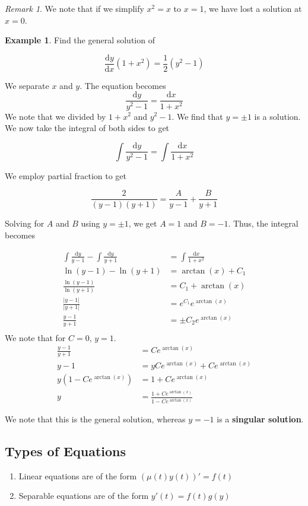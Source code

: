 \documentclass[11pt]{article}
\theoremstyle{plain} %
\theoremstyle{definition}
\theoremstyle{example}
\newtheorem*{example}{Example}
\theoremstyle{remark}
\newtheorem*{remark}{Remark}
\begin{document}
\begin{remark}
We note that if we simplify $x^2=x$ to $x=1$, we have lost a solution at $x=0$. 
\end{remark}

\begin{example}
Find the general solution of 

$$\frac{\mathrm d y}{\mathrm d x}\left(1+x^2\right) = \frac{1}{2}\left(y^2-1\right)$$
\end{example}

We separate $x$ and $y$. The equation becomes$$\frac{\mathrm d y}{y^2-1} = \frac{\mathrm d x}{1+x^2}$$ We note that we divided by $1+x^2$ and $y^2-1$. We find that $y=\pm 1$ is a solution. We now take the integral of both sides to get

$$ \int \frac{\mathrm d y}{y^2-1} =\int  \frac{\mathrm d x}{1+x^2}$$

We employ partial fraction to get 

$$\frac{2}{(y-1)(y+1)} = \frac{A}{y-1} + \frac{B}{y+1}$$

Solving for $A$ and $B$ using $y = \pm 1$, we get $A = 1$ and $B = -1$. Thus, the integral becomes

\begin{align*}
	\int \frac{\mathrm d y}{y-1} - \int \frac{\mathrm d y}{y+1} &= \int \frac{\mathrm d x}{1+x^2} \\
	\ln(y-1) - \ln(y+1) &= \arctan(x)+C_1\\
	\frac{\ln(y-1)}{\ln(y+1)} &= C_1 + \arctan(x)\\
	\frac{|y-1|}{|y+1|} &= e^{C_1}e^{\arctan(x)}\\
	\frac{y-1}{y+1} &= \pm C_2e^{\arctan(x)}\\
\end{align*}
We note that for $C=0$, $y=1$.
\begin{align*}
	\frac{y-1}{y+1} &= Ce^{\arctan(x)}\\
	y-1 &= yCe^{\arctan(x)} + Ce^{\arctan(x)}\\
	y\left(1-Ce^{\arctan(x)}\right) &= 1+Ce^{\arctan(x)}\\
	y &= \frac{1+Ce^{\arctan(x)}}{1-Ce^{\arctan(x)}}
\end{align*}

We note that this is the general solution, whereas $y=-1$ is a \textbf{singular solution}.

\subsection{Types of Equations}
\begin{enumerate}
	\item Linear equations are of the form $\left(\mu(t)y(t)\right)' = f(t)$
	\item Separable equations are of the form $y'(t) = f(t)g(y)$
\end{enumerate}
\end{document}
